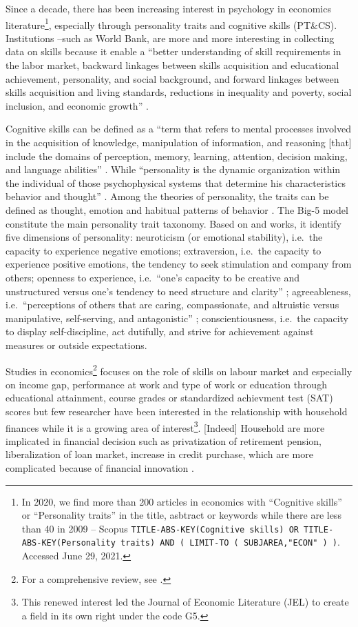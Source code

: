 \documentclass[a4paper, 11pt, onecolumn]{article}
\newcommand{\ie}{i.e.}
\begin{document}
Since a decade, there has been increasing interest in psychology in economics literature\footnote{In 2020, we find more than 200 articles in economics with ``Cognitive skills'' or ``Personality traits'' in the title, asbtract or keywords while there are less than 40 in 2009 -- Scopus \texttt{TITLE-ABS-KEY(Cognitive skills) OR TITLE-ABS-KEY(Personality traits) AND ( LIMIT-TO ( SUBJAREA,"ECON" ) )}. Accessed June 29, 2021.}, especially through personality traits and cognitive skills (PT\&CS).
Institutions --such as World Bank, are more and more interesting in collecting data on skills because it enable a ``better understanding of skill requirements in the labor market, backward linkages between skills acquisition and educational achievement, personality, and social background, and forward linkages between skills acquisition and living standards, reductions in inequality and poverty, social inclusion, and economic growth'' \citep{STEP2014}.

Cognitive skills can be defined as a ``term that refers to mental processes involved in the acquisition of knowledge, manipulation of information, and reasoning [that] include the domains of perception, memory, learning, attention, decision making, and language abilities'' \citep{Kiely2014}.
While ``personality is the dynamic organization within the individual of those psychophysical systems that determine his characteristics behavior and thought'' \citep{Allport1961}.
Among the theories of personality, the traits can be defined as thought, emotion and habitual patterns of behavior \citep{Kassin2003}.
The Big-5 model constitute the main personality trait taxonomy.
Based on \cite{Goldberg1981} and \cite{McCrae1987} works, it identify five dimensions of personality: neuroticism (or emotional stability), \ie~the capacity to experience negative emotions; extraversion, \ie~the capacity to experience positive emotions, the tendency to seek stimulation and company from others; openness to experience, \ie~``one’s capacity to be creative and unstructured versus one’s tendency to need structure and clarity'' \citep{Piedmont2014}; agreeableness, \ie~``perceptions of others that are caring, compassionate, and altruistic versus manipulative, self-serving, and antagonistic'' \citep{Piedmont2014}; conscientiousness, \ie~the capacity to display self-discipline, act dutifully, and strive for achievement against measures or outside expectations.	

Studies in economics\footnote{For a comprehensive review, see \cite{Almlund2011}.} focuses on the role of skills on labour market and especially on income gap, performance at work and type of work or education through  educational attainment, course grades or standardized achievment test (SAT) scores but few researcher have been interested in the relationship with household finances while it is a growing area of interest\footnote{This renewed interest led the Journal of Economic Literature (JEL) to create a field in its own right under the code G5.}.
[Indeed] Household are more implicated in financial decision such as privatization of retirement pension, liberalization of loan market, increase in credit purchase, which are more complicated because of financial innovation \citep{Guiso2013}.
\end{document}
